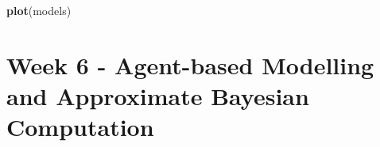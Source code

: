 \documentclass[
]{article}
\newenvironment{Shaded}{\begin{snugshade}}{\end{snugshade}}
\newcommand{\KeywordTok}[1]{\textcolor[rgb]{0.13,0.29,0.53}{\textbf{#1}}}
\newcommand{\NormalTok}[1]{#1}
\newcommand{\OperatorTok}[1]{\textcolor[rgb]{0.81,0.36,0.00}{\textbf{#1}}}
\begin{document}
\begin{Shaded}
\begin{Highlighting}[]
\KeywordTok{plot}\NormalTok{(models)}
\end{Highlighting}
\end{Shaded}

\begin{Shaded}
\end{Shaded}

\hypertarget{week-6---agent-based-modelling-and-approximate-bayesian-computation}{%
\section{Week 6 - Agent-based Modelling and Approximate Bayesian
Computation}\label{week-6---agent-based-modelling-and-approximate-bayesian-computation}}
\end{document}
